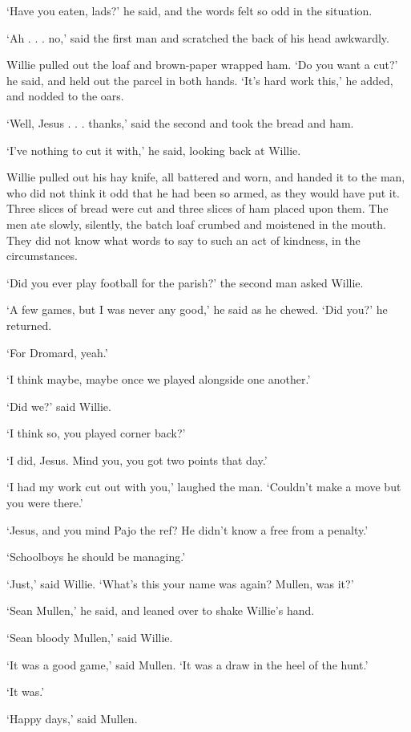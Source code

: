 \documentclass[10pt,a4paper]{article}
\begin{document}
‘Have you eaten, lads?’ he said, and the words felt so odd in the situation.

‘Ah . . . no,’ said the first man and scratched the back of his head awkwardly.

Willie pulled out the loaf and brown-paper wrapped ham. ‘Do you want a cut?’ he said, and held out the parcel in both hands. ‘It’s hard work this,’ he added, and nodded to the oars.

‘Well, Jesus . . . thanks,’ said the second and took the bread and ham.

‘I’ve nothing to cut it with,’ he said, looking back at Willie.

Willie pulled out his hay knife, all battered and worn, and handed it to the man, who did not think it odd that he had been so armed, as they would have put it. Three slices of bread were cut and three slices of ham placed upon them. The men ate slowly, silently, the batch loaf crumbed and moistened in the mouth. They did not know what words to say to such an act of kindness, in the circumstances.

‘Did you ever play football for the parish?’ the second man asked Willie.

‘A few games, but I was never any good,’ he said as he chewed. ‘Did you?’ he returned.

‘For Dromard, yeah.’

‘I think maybe, maybe once we played alongside one another.’

‘Did we?’ said Willie.

‘I think so, you played corner back?’

‘I did, Jesus. Mind you, you got two points that day.’

‘I had my work cut out with you,’ laughed the man. ‘Couldn’t make a move but you were there.’

‘Jesus, and you mind Pajo the ref? He didn’t know a free from a penalty.’

‘Schoolboys he should be managing.’

‘Just,’ said Willie. ‘What’s this your name was again? Mullen, was it?’

‘Sean Mullen,’ he said, and leaned over to shake Willie’s hand.

‘Sean bloody Mullen,’ said Willie.

‘It was a good game,’ said Mullen. ‘It was a draw in the heel of the hunt.’

‘It was.’

‘Happy days,’ said Mullen.
\end{document}
